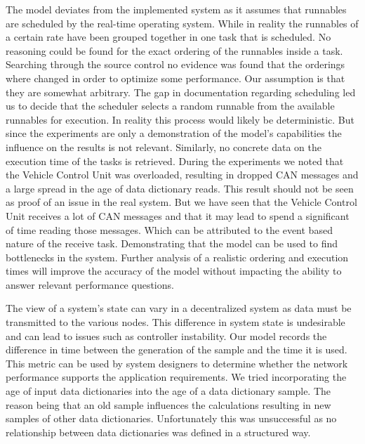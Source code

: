 The model deviates from the implemented system as it assumes that runnables are scheduled by the real-time operating system. While in reality the runnables of a certain rate have been grouped together in one task that is scheduled. No reasoning could be found for the exact ordering of the runnables inside a task. Searching through the source control no evidence was found that the orderings where changed in order to optimize some performance. Our assumption is that they are somewhat arbitrary. The gap in documentation regarding scheduling led us to decide that the scheduler selects a random runnable from the available runnables for execution. In reality this process would likely be deterministic. But since the experiments are only a demonstration of the model's capabilities the influence on the results is not relevant. Similarly, no concrete data on the execution time of the tasks is retrieved. During the experiments we noted that the Vehicle Control Unit was overloaded, resulting in dropped CAN messages and a large spread in the age of data dictionary reads. This result should not be seen as proof of an issue in the real system. But we have seen that the Vehicle Control Unit receives a lot of CAN messages and that it may lead to spend a significant of time reading those messages. Which can be attributed to the event based nature of the receive task. Demonstrating that the model can be used to find bottlenecks in the system. Further analysis of a realistic ordering and execution times will improve the accuracy of the model without impacting the ability to answer relevant performance questions.

The view of a system's state can vary in a decentralized system as data must be transmitted to the various nodes. This difference in system state is undesirable and can lead to issues such as controller instability. Our model records the difference in time between the generation of the sample and the time it is used. This metric can be used by system designers to determine whether the network performance supports the application requirements. We tried incorporating the age of input data dictionaries into the age of a data dictionary sample. The reason being that an old sample influences the calculations resulting in new samples of other data dictionaries. Unfortunately this was unsuccessful as no relationship between data dictionaries was defined in a structured way.

